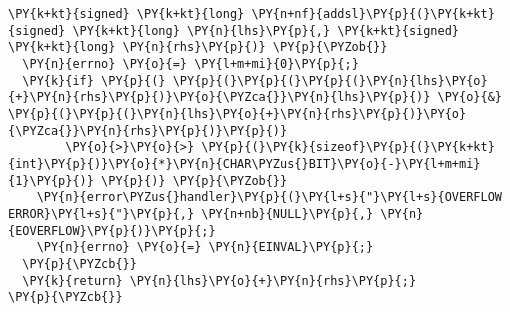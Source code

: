 \begin{Verbatim}[commandchars=\\\{\},codes={\catcode`\$=3\catcode`\^=7\catcode`\_=8}]
\PY{k+kt}{signed} \PY{k+kt}{long} \PY{n+nf}{addsl}\PY{p}{(}\PY{k+kt}{signed} \PY{k+kt}{long} \PY{n}{lhs}\PY{p}{,} \PY{k+kt}{signed} \PY{k+kt}{long} \PY{n}{rhs}\PY{p}{)} \PY{p}{\PYZob{}}
  \PY{n}{errno} \PY{o}{=} \PY{l+m+mi}{0}\PY{p}{;}
  \PY{k}{if} \PY{p}{(} \PY{p}{(}\PY{p}{(}\PY{p}{(}\PY{n}{lhs}\PY{o}{+}\PY{n}{rhs}\PY{p}{)}\PY{o}{\PYZca{}}\PY{n}{lhs}\PY{p}{)} \PY{o}{&} \PY{p}{(}\PY{p}{(}\PY{n}{lhs}\PY{o}{+}\PY{n}{rhs}\PY{p}{)}\PY{o}{\PYZca{}}\PY{n}{rhs}\PY{p}{)}\PY{p}{)}
        \PY{o}{>}\PY{o}{>} \PY{p}{(}\PY{k}{sizeof}\PY{p}{(}\PY{k+kt}{int}\PY{p}{)}\PY{o}{*}\PY{n}{CHAR\PYZus{}BIT}\PY{o}{-}\PY{l+m+mi}{1}\PY{p}{)} \PY{p}{)} \PY{p}{\PYZob{}}
    \PY{n}{error\PYZus{}handler}\PY{p}{(}\PY{l+s}{"}\PY{l+s}{OVERFLOW ERROR}\PY{l+s}{"}\PY{p}{,} \PY{n+nb}{NULL}\PY{p}{,} \PY{n}{EOVERFLOW}\PY{p}{)}\PY{p}{;}
    \PY{n}{errno} \PY{o}{=} \PY{n}{EINVAL}\PY{p}{;}
  \PY{p}{\PYZcb{}}
  \PY{k}{return} \PY{n}{lhs}\PY{o}{+}\PY{n}{rhs}\PY{p}{;}
\PY{p}{\PYZcb{}}
\end{Verbatim}
